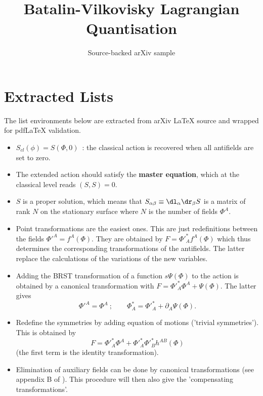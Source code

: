 \documentclass[11pt]{article}
\title{Batalin-Vilkovisky Lagrangian Quantisation}
\author{Source-backed arXiv sample}
\date{}
\begin{document}
\maketitle
\section{Extracted Lists}

The list environments below are extracted from arXiv LaTeX source and wrapped for pdfLaTeX validation.

\begin{itemize}
\item $S_{cl}(\phi ) = S(\Phi ,0)$~: the classical
action is recovered when all antifields are set to zero.
\item The extended action should satisfy the {\bf master equation}, which
at the classical level reads $(S,S)=0$.
\item $S$ is a proper solution, which means that $S_{\alpha \beta }\equiv
\dl_\alpha \dr_\beta S$ is
a matrix of rank $N$ on the stationary surface where $N$ is the number of
fields $\Phi ^A$.
\end{itemize}

\begin{itemize}
\item Point transformations are the easiest ones. This are just
redefinitions between the fields $\Phi '^A=f^A(\Phi )$. They are obtained
by $F=\Phi '^*_A f^A(\Phi )$ which thus determines the corresponding
transformations of the antifields. The latter replace the calculations of
the variations of the new variables.
\item Adding the BRST transformation of a function $s\Psi(\Phi )$ to the
action is obtained by a canonical transformation with $F=\Phi '^*_A\Phi ^A+
\Psi (\Phi )$. The latter gives
\begin{equation}
\Phi'^A = \Phi^A \ ;\qquad
\Phi ^*_A =\Phi'^*_A + \partial _A \Psi (\Phi ).
\label{gfermion}\end{equation}
\item Redefine the symmetries by adding equation of motions
('trivial symmetries'). This is obtained by
\begin{equation}
F=\Phi '^*_A\Phi ^A+ \Phi '^*_A\Phi '^*_B h^{AB}(\Phi )
\end{equation}
(the first term is the identity transformation).
\item Elimination of auxiliary fields can be done by canonical
transformations
(see appendix B of \cite{disp}). This procedure will then also give
the 'compensating transformations'. \end{itemize}
\end{document}
